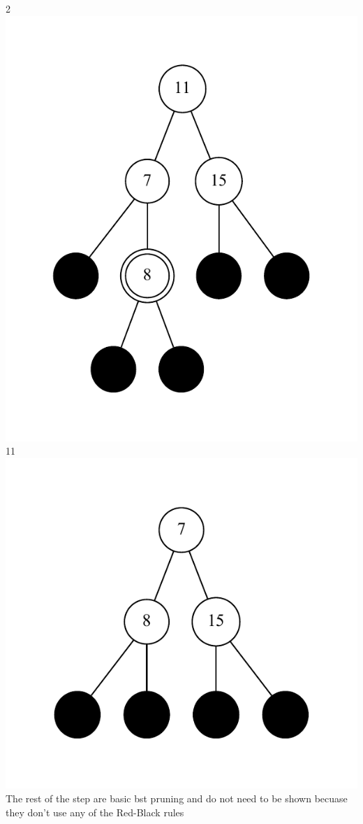 \documentclass[11pt]{article}
\begin{document}
 2\\
\includegraphics{bstep4.pdf}\\
 11\\
\includegraphics{bstep5.pdf}\\
The rest of the step are basic bst pruning and do not need to be shown becuase they don't use any
of the Red-Black rules
\end{document}
